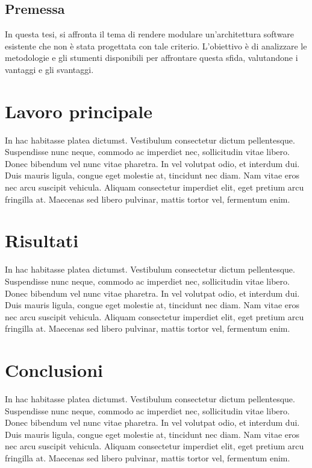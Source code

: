 \documentclass[target=bach,aauheader=,style=]{thud}
\begin{document}
\section{Premessa}
In questa tesi, si affronta il tema di rendere modulare un'architettura software esistente che non è stata progettata con tale criterio. L'obiettivo è di analizzare le metodologie e gli stumenti disponibili per affrontare questa sfida, valutandone i vantaggi e gli svantaggi.


\chapter{Lavoro principale}
In hac habitasse platea dictumst. Vestibulum consectetur dictum pellentesque. Suspendisse nunc neque, commodo ac imperdiet nec, sollicitudin vitae libero. Donec bibendum vel nunc vitae pharetra. In vel volutpat odio, et interdum dui. Duis mauris ligula, congue eget molestie at, tincidunt nec diam. Nam vitae eros nec arcu suscipit vehicula. Aliquam consectetur imperdiet elit, eget pretium arcu fringilla at. Maecenas \cite{Knu86} sed libero pulvinar, mattis tortor vel, fermentum enim.


\chapter{Risultati}
In hac habitasse platea dictumst. Vestibulum consectetur dictum pellentesque. Suspendisse nunc neque, commodo ac imperdiet nec, sollicitudin vitae libero. Donec bibendum vel nunc vitae pharetra. In vel volutpat odio, et interdum dui. Duis mauris ligula, congue eget molestie at, tincidunt nec diam. Nam vitae eros nec arcu suscipit vehicula. Aliquam consectetur imperdiet elit, eget pretium arcu fringilla at. Maecenas \cite{Knu86} sed libero pulvinar, mattis tortor vel, fermentum enim.


\chapter{Conclusioni}
In hac habitasse platea dictumst. Vestibulum consectetur dictum pellentesque. Suspendisse nunc neque, commodo ac imperdiet nec, sollicitudin vitae libero. Donec bibendum vel nunc vitae pharetra. In vel volutpat odio, et interdum dui. Duis mauris ligula, congue eget molestie at, tincidunt nec diam. Nam vitae eros nec arcu suscipit vehicula. Aliquam consectetur imperdiet elit, eget pretium arcu fringilla at. Maecenas \cite{Knu86} sed libero pulvinar, mattis tortor vel, fermentum enim.
\end{document}
